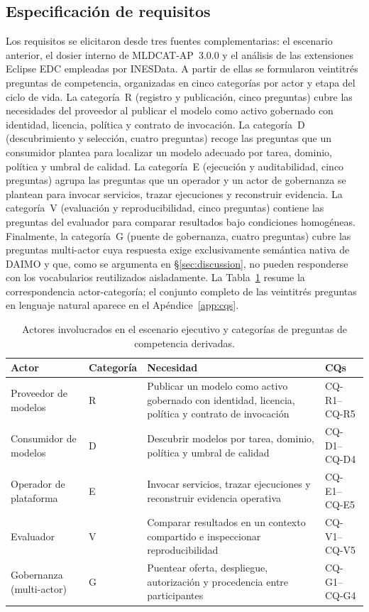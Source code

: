 \documentclass[11pt,a4paper]{article}
\newcommand{\cq}[1]{\textsf{#1}}
\begin{document}
\subsection{Especificación de requisitos}\label{sec:method-req}

Los requisitos se elicitaron desde tres fuentes complementarias: el escenario anterior, el dosier interno de MLDCAT-AP~3.0.0 y el análisis de las extensiones Eclipse EDC empleadas por INESData. A partir de ellas se formularon veintitrés preguntas de competencia, organizadas en cinco categorías por actor y etapa del ciclo de vida. La categoría~R (registro y publicación, cinco preguntas) cubre las necesidades del proveedor al publicar el modelo como activo gobernado con identidad, licencia, política y contrato de invocación. La categoría~D (descubrimiento y selección, cuatro preguntas) recoge las preguntas que un consumidor plantea para localizar un modelo adecuado por tarea, dominio, política y umbral de calidad. La categoría~E (ejecución y auditabilidad, cinco preguntas) agrupa las preguntas que un operador y un actor de gobernanza se plantean para invocar servicios, trazar ejecuciones y reconstruir evidencia. La categoría~V (evaluación y reproducibilidad, cinco preguntas) contiene las preguntas del evaluador para comparar resultados bajo condiciones homogéneas. Finalmente, la categoría~G (puente de gobernanza, cuatro preguntas) cubre las preguntas multi-actor cuya respuesta exige exclusivamente semántica nativa de DAIMO y que, como se argumenta en §\ref{sec:discussion}, no pueden responderse con los vocabularios reutilizados aisladamente. La Tabla~\ref{tab:actors} resume la correspondencia actor-categoría; el conjunto completo de las veintitrés preguntas en lenguaje natural aparece en el Apéndice~\ref{app:cqs}.

\begin{table}[t]
\small\sf\centering
\caption{Actores involucrados en el escenario ejecutivo y categorías de preguntas de competencia derivadas.\label{tab:actors}}
\begin{tabular}{@{}p{3.5cm}p{2cm}p{7cm}p{2.5cm}@{}}
\toprule
\textbf{Actor} & \textbf{Categoría} & \textbf{Necesidad} & \textbf{CQs} \\
\midrule
Proveedor de modelos & R & Publicar un modelo como activo gobernado con identidad, licencia, política y contrato de invocación & \cq{CQ-R1}--\cq{CQ-R5} \\
Consumidor de modelos & D & Descubrir modelos por tarea, dominio, política y umbral de calidad & \cq{CQ-D1}--\cq{CQ-D4} \\
Operador de plataforma & E & Invocar servicios, trazar ejecuciones y reconstruir evidencia operativa & \cq{CQ-E1}--\cq{CQ-E5} \\
Evaluador & V & Comparar resultados en un contexto compartido e inspeccionar reproducibilidad & \cq{CQ-V1}--\cq{CQ-V5} \\
Gobernanza (multi-actor) & G & Puentear oferta, despliegue, autorización y procedencia entre participantes & \cq{CQ-G1}--\cq{CQ-G4} \\
\bottomrule
\end{tabular}
\end{table}
\end{document}

